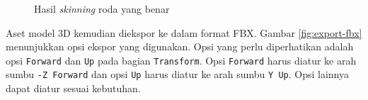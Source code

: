 \begin{figure}[!h]
    \centering
    \hfill
    \caption{Hasil \textit{skinning} roda yang benar}
    \label{fig:wheel-skinning}
\end{figure}

Aset model 3D kemudian diekspor ke dalam format FBX. Gambar \ref{fig:export-fbx}
menunjukkan opsi ekspor yang digunakan. Opsi yang perlu diperhatikan adalah opsi
\verb|Forward| dan \verb|Up| pada bagian \verb|Transform|. Opsi \verb|Forward|
harus diatur ke arah sumbu \verb|-Z Forward| dan opsi \verb|Up| harus diatur ke
arah sumbu \verb|Y Up|. Opsi lainnya dapat diatur sesuai kebutuhan.

